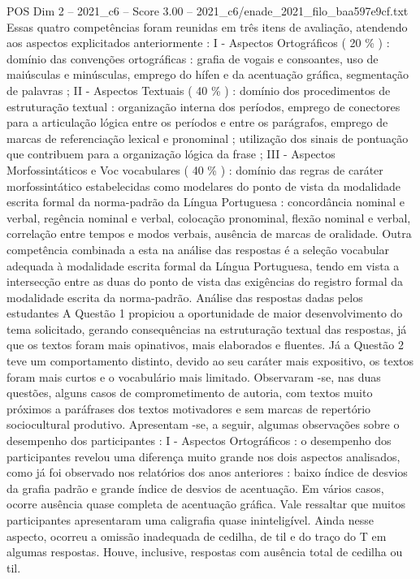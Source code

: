 \begin{textsample}{POS Dim 2 – 2021\_c6 – Score 3.00 – 2021\_c6/enade\_2021\_filo\_baa597e9cf.txt}
Essas quatro competências foram reunidas em três itens de avaliação, atendendo aos aspectos explicitados anteriormente : I - Aspectos Ortográficos ( 20 \% ) : domínio das convenções ortográficas : grafia de vogais e consoantes, uso de maiúsculas e minúsculas, emprego do hífen e da acentuação gráfica, segmentação de palavras ; II - Aspectos Textuais ( 40 \% ) : domínio dos procedimentos de estruturação textual : organização interna dos períodos, emprego de conectores para a articulação lógica entre os períodos e entre os parágrafos, emprego de marcas de referenciação lexical e pronominal ; utilização dos sinais de pontuação que contribuem para a organização lógica da frase ; III - Aspectos Morfossintáticos e Voc vocabulares ( 40 \% ) : domínio das regras de caráter morfossintático estabelecidas como modelares do ponto de vista da modalidade escrita formal da norma-padrão da Língua Portuguesa : concordância nominal e verbal, regência nominal e verbal, colocação pronominal, flexão nominal e verbal, correlação entre tempos e modos verbais, ausência de marcas de oralidade.
Outra competência combinada a esta na análise das respostas é a seleção vocabular adequada à modalidade escrita formal da Língua Portuguesa, tendo em vista a intersecção entre as duas do ponto de vista das exigências do registro formal da modalidade escrita da norma-padrão.
Análise das respostas dadas pelos estudantes A Questão 1 propiciou a oportunidade de maior desenvolvimento do tema solicitado, gerando consequências na estruturação textual das respostas, já que os textos foram mais opinativos, mais elaborados e fluentes.
Já a Questão 2 teve um comportamento distinto, devido ao seu caráter mais expositivo, os textos foram mais curtos e o vocabulário mais limitado.
Observaram -se, nas duas questões, alguns casos de comprometimento de autoria, com textos muito próximos a paráfrases dos textos motivadores e sem marcas de repertório sociocultural produtivo.
Apresentam -se, a seguir, algumas observações sobre o desempenho dos participantes : I - Aspectos Ortográficos : o desempenho dos participantes revelou uma diferença muito grande nos dois aspectos analisados, como já foi observado nos relatórios dos anos anteriores : baixo índice de desvios da grafia padrão e grande índice de desvios de acentuação.
Em vários casos, ocorre ausência quase completa de acentuação gráfica.
Vale ressaltar que muitos participantes apresentaram uma caligrafia quase ininteligível.
Ainda nesse aspecto, ocorreu a omissão inadequada de cedilha, de til e do traço do T em algumas respostas.
Houve, inclusive, respostas com ausência total de cedilha ou til.

\end{textsample}
